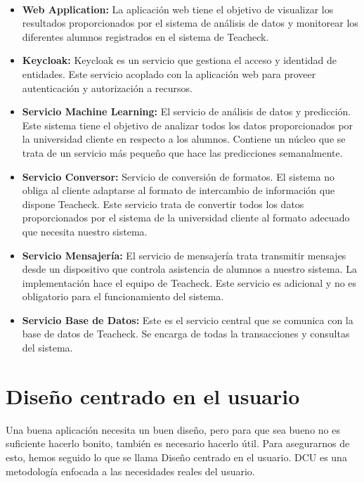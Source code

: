 \paragraph{}
\begin{itemize}
  \item{\textbf{Web Application:}} La aplicación web tiene el objetivo
    de visualizar los resultados proporcionados por el sistema de
    análisis de datos y monitorear los diferentes alumnos registrados
    en el sistema de Teacheck.
  \item{\textbf{Keycloak:}} Keycloak es un servicio que gestiona el
    acceso y identidad de entidades. Este servicio acoplado con la
    aplicación web para proveer autenticación y autorización a
    recursos.
  \item{\textbf{Servicio Machine Learning:}} El servicio de análisis
    de datos y predicción. Este sistema tiene el objetivo de analizar
    todos los datos proporcionados por la universidad cliente en
    respecto a los alumnos. Contiene un núcleo que se trata de un
    servicio más pequeño que hace las predicciones semanalmente.
  \item{\textbf{Servicio Conversor:}} Servicio de conversión de
    formatos. El sistema no obliga al cliente adaptarse al formato de
    intercambio de información que dispone Teacheck. Este servicio
    trata de convertir todos los datos proporcionados por el sistema
    de la universidad cliente al formato adecuado que necesita nuestro
    sistema.
  \item{\textbf{Servicio Mensajería:}} El servicio de mensajería trata
    transmitir mensajes desde un dispositivo que controla asistencia
    de alumnos a nuestro sistema. La implementación hace el equipo de
    Teacheck. Este servicio es adicional y no es obligatorio para el
    funcionamiento del sistema.
  \item{\textbf{Servicio Base de Datos:}} Este es el servicio central
    que se comunica con la base de datos de Teacheck. Se encarga de
    todas la transacciones y consultas del sistema.
\end{itemize}
\section{Diseño centrado en el usuario}
Una buena aplicación necesita un buen diseño, pero para que sea bueno
no es suficiente hacerlo bonito, también es necesario hacerlo
útil. Para asegurarnos de esto, hemos seguido lo que se llama Diseño
centrado en el usuario. DCU es una metodología enfocada a las
necesidades reales del usuario.
